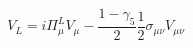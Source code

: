\begin{equation} 
V_{L} = i \Pi_{\mu}^{L} V_{\mu} - 
 \frac{1- \gamma_{5}}{2} \frac{1}{2} \sigma_{\mu \nu} V_{\mu \nu} 
\label{eq:vi} 
\end{equation} 
